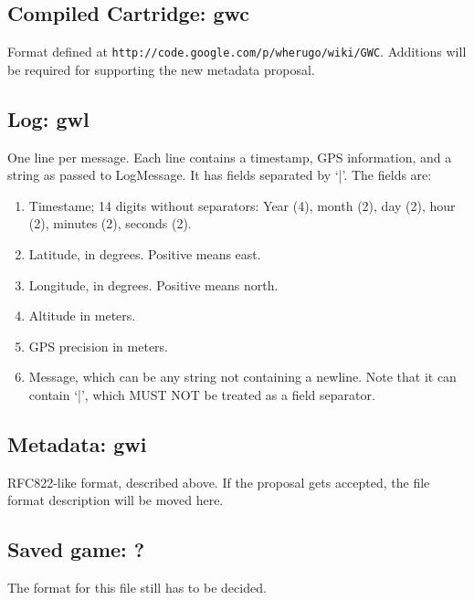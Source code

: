 \documentclass{article}
\begin{document}
\subsection{Compiled Cartridge: gwc}
Format defined at \verb-http://code.google.com/p/wherugo/wiki/GWC-. Additions will be required for supporting the new metadata proposal.

\subsection{Log: gwl}
One line per message. Each line contains a timestamp, GPS information, and a string as passed to LogMessage. It has fields separated by `|'. The fields are:
\begin{enumerate}
	\item Timestame; 14 digits without separators: Year (4), month (2), day (2), hour (2), minutes (2), seconds (2).
	\item Latitude, in degrees. Positive means east.
	\item Longitude, in degrees. Positive means north.
	\item Altitude in meters.
	\item GPS precision in meters.
	\item Message, which can be any string not containing a newline. Note that it can contain `|', which MUST NOT be treated as a field separator.
\end{enumerate}

\subsection{Metadata: gwi}
RFC822-like format, described above. If the proposal gets accepted, the file format description will be moved here.
\subsection{Saved game: ?}
The format for this file still has to be decided.
\end{document}
